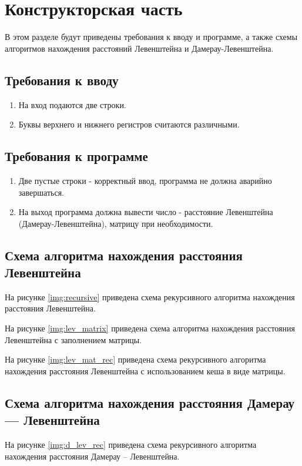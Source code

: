 \chapter{Конструкторская часть}
В этом разделе будут приведены требования к вводу и программе, а также схемы алгоритмов нахождения расстояний Левенштейна и Дамерау-Левенштейна.

\section{Требования к вводу}
\begin{enumerate}
	\item На вход подаются две строки.
	\item Буквы верхнего и нижнего регистров считаются различными.
\end{enumerate}

\section{Требования к программе}
\begin{enumerate}
	\item Две пустые строки - корректный ввод, программа не должна аварийно завершаться.
	\item На выход программа должна вывести число - расстояние Левенштейна (Дамерау-Левенштейна), матрицу при необходимости.
\end{enumerate}

\section{Схема алгоритма нахождения расстояния Левенштейна}

На рисунке \ref{img:recursive} приведена схема рекурсивного алгоритма нахождения расстояния Левенштейна.

На рисунке \ref{img:lev_matrix} приведена схема алгоритма нахождения расстояния Левенштейна с заполнением матрицы.

На рисунке \ref{img:lev_mat_rec} приведена схема рекурсивного алгоритма нахождения расстояния Левенштейна с использованием кеша в виде матрицы.

\section{Схема алгоритма нахождения расстояния Дамерау — Левенштейна}

На рисунке \ref{img:d_lev_rec} приведена схема рекурсивного алгоритма нахождения расстояния Дамерау -- Левенштейна.

